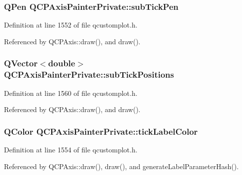 \subsubsection[{sub\+Tick\+Pen}]{\setlength{\rightskip}{0pt plus 5cm}Q\+Pen Q\+C\+P\+Axis\+Painter\+Private\+::sub\+Tick\+Pen}\label{class_q_c_p_axis_painter_private_a9b9cf594cd16575f52ecda9abef4e412}


Definition at line 1552 of file qcustomplot.\+h.



Referenced by Q\+C\+P\+Axis\+::draw(), and draw().

\hypertarget{class_q_c_p_axis_painter_private_afcde7484bbcc1004b8f59ab984ada6f9}{}
\subsubsection[{sub\+Tick\+Positions}]{\setlength{\rightskip}{0pt plus 5cm}Q\+Vector$<$double$>$ Q\+C\+P\+Axis\+Painter\+Private\+::sub\+Tick\+Positions}\label{class_q_c_p_axis_painter_private_afcde7484bbcc1004b8f59ab984ada6f9}


Definition at line 1560 of file qcustomplot.\+h.



Referenced by Q\+C\+P\+Axis\+::draw(), and draw().

\hypertarget{class_q_c_p_axis_painter_private_a88032cf15c997e3956b79617b859e8ad}{}
\subsubsection[{tick\+Label\+Color}]{\setlength{\rightskip}{0pt plus 5cm}Q\+Color Q\+C\+P\+Axis\+Painter\+Private\+::tick\+Label\+Color}\label{class_q_c_p_axis_painter_private_a88032cf15c997e3956b79617b859e8ad}


Definition at line 1554 of file qcustomplot.\+h.



Referenced by Q\+C\+P\+Axis\+::draw(), draw(), and generate\+Label\+Parameter\+Hash().

\hypertarget{class_q_c_p_axis_painter_private_a06cb4b185feb1e560e01d65887e4d80d}{}

